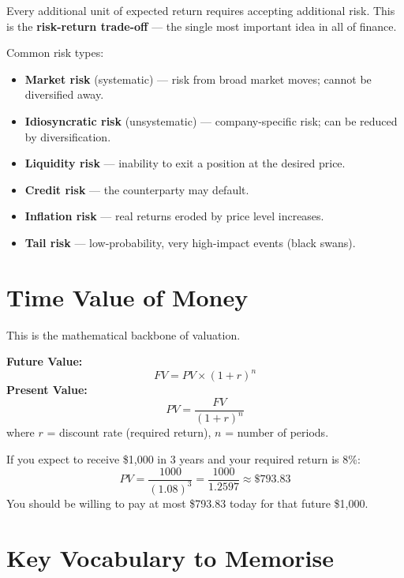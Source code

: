 Every additional unit of expected return requires accepting additional risk. This is the
\textbf{risk-return trade-off} — the single most important idea in all of finance.

Common risk types:
\begin{itemize}
  \item \textbf{Market risk} (systematic) — risk from broad market moves; cannot be diversified away.
  \item \textbf{Idiosyncratic risk} (unsystematic) — company-specific risk; can be reduced by diversification.
  \item \textbf{Liquidity risk} — inability to exit a position at the desired price.
  \item \textbf{Credit risk} — the counterparty may default.
  \item \textbf{Inflation risk} — real returns eroded by price level increases.
  \item \textbf{Tail risk} — low-probability, very high-impact events (black swans).
\end{itemize}

\section{Time Value of Money}

This is the mathematical backbone of valuation.

\begin{formulabox}
\textbf{Future Value:}
\[
  FV = PV \times (1 + r)^n
\]
\textbf{Present Value:}
\[
  PV = \frac{FV}{(1 + r)^n}
\]
where $r$ = discount rate (required return), $n$ = number of periods.
\end{formulabox}

\begin{examplebox}
If you expect to receive \$1{,}000 in 3 years and your required return is 8\%:
\[
  PV = \frac{1000}{(1.08)^3} = \frac{1000}{1.2597} \approx \$793.83
\]
You should be willing to pay at most \$793.83 today for that future \$1{,}000.
\end{examplebox}

\section{Key Vocabulary to Memorise}

